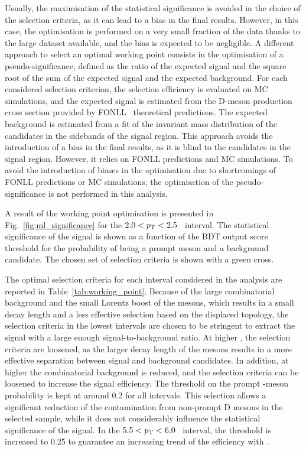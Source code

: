 Usually, the maximisation of the statistical significance is avoided in the choice of the selection criteria, as it can lead to a bias in the final results. However, in this case, the optimisation is performed on a very small fraction of the data thanks to the large dataset available, and the bias is expected to be negligible. A different approach to select an optimal working point consists in the optimisation of a pseudo-significance, defined as the ratio of the expected signal and the square root of the sum of the expected signal and the expected background. For each considered selection criterion, the selection efficiency is evaluated on MC simulations, and the expected signal is estimated from the D-meson production cross section provided by FONLL~\cite{Cacciari:1998it} theoretical predictions. The expected background is estimated from a fit of the invariant mass distribution of the candidates in the sidebands of the signal region. This approach avoids the introduction of a bias in the final results, as it is blind to the candidates in the signal region. However, it relies on FONLL predictions and MC simulations. To avoid the introduction of biases in the optimisation due to shortcomings of FONLL predictions or MC simulations, the optimisation of the pseudo-significance is not performed in this analysis.

A result of the working point optimisation is presented in Fig.~\ref{fig:ml_significance} for the \mbox{$2.0<p_\mathrm{T}<2.5$~\gevc} interval. The statistical significance of the signal is shown as a function of the BDT output score threshold for the probability of being a prompt \ds meson and a background candidate. The chosen set of selection criteria is shown with a green cross.

The optimal selection criteria for each \pt interval considered in the analysis are reported in Table~\ref{tab:working_point}. Because of the large combinatorial background and the small Lorentz boost of the \ds mesons, which results in a small decay length and a less effective selection based on the displaced topology, the selection criteria in the lowest \pt intervals are chosen to be stringent to extract the signal with a large enough signal-to-background ratio. At higher \pt, the selection criteria are loosened, as the larger decay length of the \ds mesons results in a more effective separation between signal and background candidates. In addition, at higher \pt the combinatorial background is reduced, and the selection criteria can be loosened to increase the signal efficiency. The threshold on the prompt \ds-meson probability is kept at around 0.2 for all \pt intervals. This selection allows a significant reduction of the contamination from non-prompt D mesons in the selected sample, while it does not considerably influence the statistical significance of the signal. In the \mbox{$5.5<p_\mathrm{T}<6.0$~\gevc} interval, the threshold is increased to 0.25 to guarantee an increasing trend of the efficiency with \pt.

